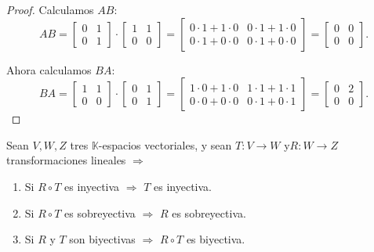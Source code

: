 \documentclass[12pt]{article}
\newcommand\K{\ensuremath{\mathbb{K}}}
\begin{document}
\begin{proof}
     Calculamos \(AB\):
    \[
    AB = \begin{bmatrix}
    0 & 1 \\
    0 & 1
    \end{bmatrix} \cdot \begin{bmatrix}
    1 & 1 \\
    0 & 0
    \end{bmatrix} = \begin{bmatrix}
    0 \cdot 1 + 1 \cdot 0 &  0 \cdot 1 + 1 \cdot 0  \\
    0 \cdot 1 + 0 \cdot 0 & 0 \cdot 1 + 0 \cdot 0
    \end{bmatrix} = \begin{bmatrix}
    0 & 0 \\
    0 & 0
    \end{bmatrix}.
    \]
    
     Ahora calculamos \(BA\):
    \[
    BA = \begin{bmatrix}
    1 & 1 \\
    0 & 0
    \end{bmatrix} \cdot \begin{bmatrix}
    0 & 1 \\
    0 & 1
    \end{bmatrix} = \begin{bmatrix}
    1 \cdot 0 + 1 \cdot 0 & 1 \cdot 1 + 1 \cdot 1 \\
    0 \cdot 0 + 0 \cdot 0 & 0 \cdot 1+ 0 \cdot 1
    \end{bmatrix} = \begin{bmatrix}
    0 & 2 \\
    0 & 0
    \end{bmatrix}.
    \]

\end{proof}

\bigskip

\begin{theorem}
    Sean $V, W, Z$ tres $\K$-espacios vectoriales, y sean $T : V \to W$ y$ R : W \to Z$ transformaciones lineales $\Rightarrow$

    \begin{enumerate}
        \item Si $R \circ T$ es inyectiva $\Rightarrow$ $T$ es inyectiva.
        \item Si $R \circ T$ es sobreyectiva $\Rightarrow$ $R$ es sobreyectiva.
        \item Si $R$ y $T$ son biyectivas $\Rightarrow$ $R \circ T$ es biyectiva.
    \end{enumerate}

    
\end{theorem}
\end{document}
